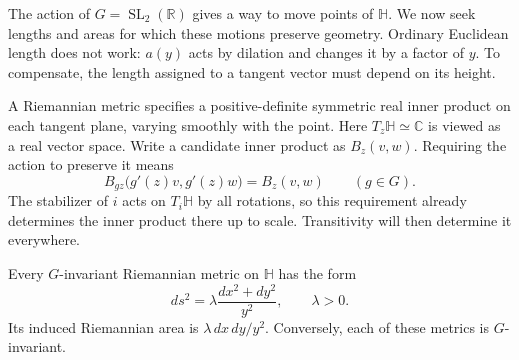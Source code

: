 The action of $G=\operatorname{SL}_2(\mathbb R)$ gives a way to move points of $\mathbb H$. We now seek lengths and areas for which these motions preserve geometry. Ordinary Euclidean length does not work: $a(y)$ acts by dilation and changes it by a factor of $y$. To compensate, the length assigned to a tangent vector must depend on its height.

A Riemannian metric specifies a positive-definite symmetric real inner product on each tangent plane, varying smoothly with the point. Here $T_z\mathbb H\simeq\mathbb C$ is viewed as a real vector space. Write a candidate inner product as $B_z(v,w)$. Requiring the action to preserve it means
\begin{equation}\label{eq:metric-invariance}
 B_{gz}\bigl(g'(z)v,g'(z)w\bigr)=B_z(v,w)
 \qquad(g\in G).
\end{equation}
The stabilizer of $i$ acts on $T_i\mathbb H$ by all rotations, so this requirement already determines the inner product there up to scale. Transitivity will then determine it everywhere.

\begin{proposition}\label{hyperbolic.invariant-geometry}
Every $G$-invariant Riemannian metric on $\mathbb H$ has the form
\[
 ds^2=\lambda\frac{dx^2+dy^2}{y^2},\qquad \lambda>0.
\]
Its induced Riemannian area is $\lambda\,dx\,dy/y^2$. Conversely, each of these metrics is $G$-invariant.
\end{proposition}


